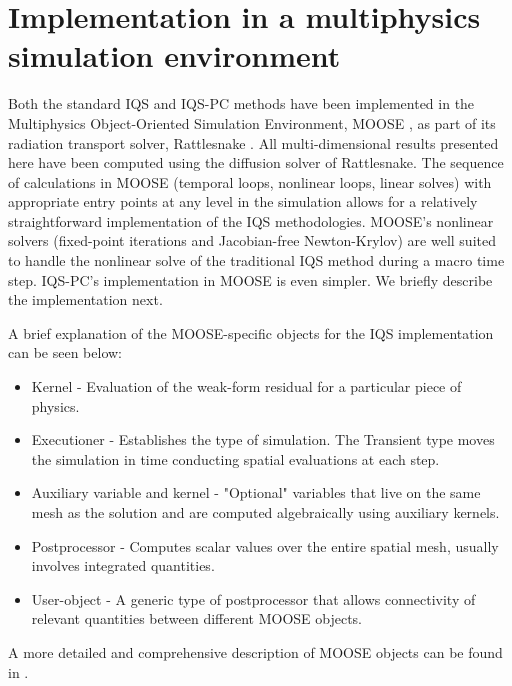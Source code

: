 \documentclass{elsarticle}
\newcommand{\iqspc}{IQS-PC\xspace}
\begin{document}
\section{Implementation in a multiphysics simulation environment}

Both the standard IQS and \iqspc methods have been implemented in the Multiphysics Object-Oriented Simulation Environment, MOOSE \cite{moose}, as part of its radiation transport solver, Rattlesnake \cite{Rattlesnake_theory}. All multi-dimensional results presented here have been computed using the diffusion solver of Rattlesnake. The sequence of 
calculations in MOOSE (temporal loops, nonlinear loops, linear solves) with appropriate entry points at any level in the simulation allows for a relatively straightforward implementation of the IQS methodologies. MOOSE's nonlinear solvers (fixed-point iterations and Jacobian-free Newton-Krylov) are well suited to handle the nonlinear solve of the traditional IQS method during a macro time step. \iqspc's implementation in MOOSE is even simpler. We briefly describe the implementation next. 

A brief explanation of the MOOSE-specific objects for the IQS implementation can be seen below:
\begin{itemize}
\item Kernel - Evaluation of the weak-form residual for a particular piece of physics.
\item Executioner - Establishes the type of simulation. The Transient type moves the simulation in time conducting spatial evaluations at each step.
\item Auxiliary variable and kernel - "Optional" variables that live on the same mesh as the solution and are computed algebraically using auxiliary kernels. 
\item Postprocessor - Computes scalar values over the entire spatial mesh, usually involves integrated quantities.
\item User-object - A generic type of postprocessor that allows connectivity of relevant quantities between different MOOSE objects.
\end{itemize}
A more detailed and comprehensive description of MOOSE objects can be found in \cite{moose_training}.
\end{document}
